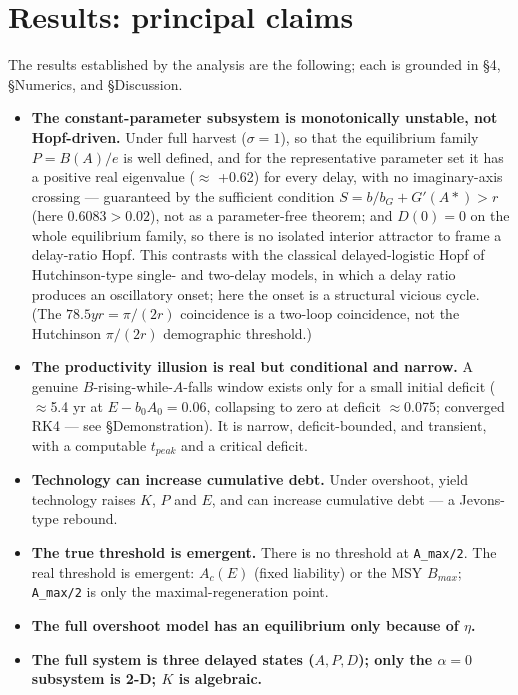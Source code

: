 \documentclass[11pt]{article}
\begin{document}
\section{Results: principal claims}

The results established by the analysis are the following; each is grounded in §4, §Numerics, and §Discussion.

\begin{itemize}
\item \textbf{The constant-parameter subsystem is monotonically unstable, not Hopf-driven.} Under full harvest ($\sigma{} = 1$), so that the equilibrium family $P = B(A)/e$ is well defined, and for the representative parameter set it has a positive real eigenvalue (\ensuremath{\approx{}} +0.62) for every delay, with no imaginary-axis crossing — guaranteed by the sufficient condition $S = b/b_{G} + G\prime{}(A*) > r$ (here $0.6083 > 0.02$), not as a parameter-free theorem; and $D(0)=0$ on the whole equilibrium family, so there is no isolated interior attractor to frame a delay-ratio Hopf. This contrasts with the classical delayed-logistic Hopf of Hutchinson-type single- and two-delay models, in which a delay ratio produces an oscillatory onset; here the onset is a structural vicious cycle. (The $78.5 yr = \pi{}/(2r)$ coincidence is a two-loop coincidence, not the Hutchinson $\pi{}/(2r)$ demographic threshold.)
\item \textbf{The productivity illusion is real but conditional and narrow.} A genuine $B$-rising-while-$A$-falls window exists only for a small initial deficit (\ensuremath{\approx{}}5.4 yr at $E-b_{0}A_{0}=0.06$, collapsing to zero at deficit \ensuremath{\approx{}}0.075; converged RK4 — see §Demonstration). It is narrow, deficit-bounded, and transient, with a computable $t_{peak}$ and a critical deficit.
\item \textbf{Technology can increase cumulative debt.} Under overshoot, yield technology raises $K$, $P$ and $E$, and can increase cumulative debt — a Jevons-type rebound.
\item \textbf{The true threshold is emergent.} There is no threshold at \texttt{A\_max/2}. The real threshold is emergent: $A_{c}(E)$ (fixed liability) or the MSY $B_{max}$; \texttt{A\_max/2} is only the maximal-regeneration point.
\item \textbf{The full overshoot model has an equilibrium only because of $\eta{}$.}
\item \textbf{The full system is three delayed states ($A,P,D$); only the $\alpha{}=0$ subsystem is 2-D; $K$ is algebraic.}

\end{itemize}
\end{document}
